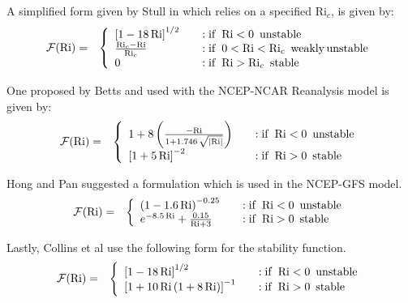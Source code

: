 A simplified form given by Stull in \cite{Jacobson2005,Stull1988} which relies on a
specified $\mathrm{Ri}_c$, is given by:
\begin{eqnarray}\label{VarDiff_Eq_F_Stull}
\mathcal{F}(\mathrm{Ri}) &=& \left\{ \begin{array} {l@{\quad \quad}l}
 \left[ 1 -18 \, \mathrm{Ri} \right]^{1/2}           &: \mathrm{if}\,\,\, \mathrm{Ri} < 0 \,\,\, \mathrm{unstable} \\
 \frac{\mathrm{Ri}_c-\mathrm{Ri}}{\mathrm{Ri}_c}     &: \mathrm{if}\,\,\, 0<\mathrm{Ri} < \mathrm{Ri}_c\,\,\, \mathrm{weakly \, unstable} \\
 0                                                   &: \mathrm{if}\,\,\, \mathrm{Ri} > \mathrm{Ri}_c \,\,\, \mathrm{stable}
\end{array}
\right.
\end{eqnarray}

One proposed by Betts \cite{Betts1996} and used with the NCEP-NCAR Reanalysis model is given by:
\begin{eqnarray}\label{VarDiff_Eq_F_Betts}
\mathcal{F}(\mathrm{Ri}) &=& \left\{ \begin{array} {l@{\quad \quad}l}
 1 + 8 \left( \frac{- \mathrm{Ri}}{1+1.746 \, \sqrt{\left| \mathrm{Ri}\right|}} \right)  &: \mathrm{if}\,\,\, \mathrm{Ri} < 0 \,\,\, \mathrm{unstable} \\
 \left[ 1+ 5 \, \mathrm{Ri} \right]^{-2}                            &: \mathrm{if}\,\,\, \mathrm{Ri} > 0 \,\,\, \mathrm{stable}
\end{array}
\right.
\end{eqnarray}

Hong and Pan \cite{Hong1996} suggested a formulation which is used in the NCEP-GFS model.
\begin{eqnarray}\label{VarDiff_Eq_F_Hong}
\mathcal{F}(\mathrm{Ri}) &=& \left\{ \begin{array} {l@{\quad \quad}l}
 \left(1 -1.6 \, \mathrm{Ri} \right)^{-0.25}                  &: \mathrm{if}\,\,\, \mathrm{Ri} < 0 \,\,\, \mathrm{unstable} \\
 e^{-8.5 \, \mathrm{Ri}} + \frac{0.15}{\mathrm{Ri} + 3}       &: \mathrm{if}\,\,\, \mathrm{Ri} > 0 \,\,\, \mathrm{stable}
\end{array}
\right.
\end{eqnarray}

Lastly, Collins et al \cite{Collins2004} use the following form for the stability function.
\begin{eqnarray}\label{VarDiff_Eq_F_Collins}
\mathcal{F}(\mathrm{Ri}) &=& \left\{ \begin{array} {l@{\quad \quad}l}
 \left[ 1 -18 \, \mathrm{Ri} \right]^{1/2}                         &: \mathrm{if}\,\,\, \mathrm{Ri} < 0 \,\,\, \mathrm{unstable} \\
 \left[ 1+ 10 \, \mathrm{Ri} \, (1+8 \, \mathrm{Ri}) \right]^{-1}  &: \mathrm{if}\,\,\, \mathrm{Ri} > 0 \,\,\, \mathrm{stable}
\end{array}
\right.
\end{eqnarray}


